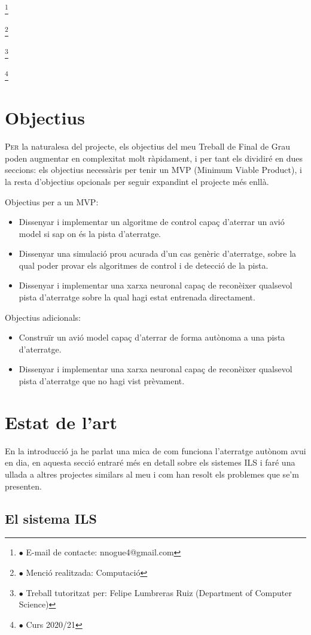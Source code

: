 \documentclass[10pt,a4paper,twocolumn,twoside]{article}
\newcommand\blfootnote[1]{%
  \begingroup
  \renewcommand\thefootnote{}\footnote{#1}%
  \addtocounter{footnote}{-1}%
  \endgroup
}
\begin{document}
\blfootnote{$\bullet$ E-mail de contacte: nnogue4@gmail.com}
\blfootnote{$\bullet$ Menció realitzada: Computació}
\blfootnote{$\bullet$ Treball tutoritzat per: Felipe Lumbreras Ruiz (Department of Computer Science)}
\blfootnote{$\bullet$ Curs 2020/21}

\section{Objectius}

\lettrine[lines=3]{P}{er} la naturalesa del projecte, els objectius del meu Treball de Final de Grau poden
augmentar en complexitat molt ràpidament, i per tant els dividiré en dues seccions: els objectius necessàris per tenir un
MVP (Minimum Viable Product), i la resta d'objectius opcionals per seguir expandint el projecte més enllà.

Objectius per a un MVP:
\begin{itemize}
  \item Dissenyar i implementar un algoritme de control capaç d'aterrar un avió model si sap on és la pista d'aterratge.
  \item Dissenyar una simulació prou acurada d'un cas genèric d'aterratge, sobre la qual poder provar els algoritmes de control i de detecció de la pista.
  \item Dissenyar i implementar una xarxa neuronal capaç de reconèixer qualsevol pista d'aterratge sobre la qual hagi estat entrenada directament.
\end{itemize}
Objectius adicionals:
\begin{itemize}
\item Construïr un avió model capaç d'aterrar de forma autònoma a una pista d'aterratge.
\item Dissenyar i implementar una xarxa neuronal capaç de reconèixer qualsevol pista d'aterratge que no hagi vist prèvament.
\end{itemize}

\section{Estat de l'art}

En la introducció ja he parlat una mica de com funciona l'aterratge autònom avui en dia, en aquesta secció entraré més en detall
sobre els sistemes ILS i faré una ullada a altres projectes similars al meu i com han resolt els problemes que se'm presenten.

\subsection{El sistema ILS}
\label{subsec-ils-system}
\end{document}
